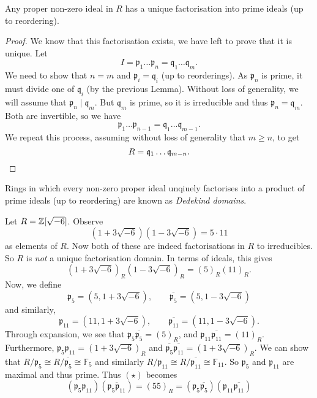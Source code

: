 
\begin{theorem}[]
	Any proper non-zero ideal in $R$ has a unique factorisation into prime
	ideals (up to reordering).
\end{theorem}

\begin{proof}
	We know that this factorisation exists,
	we have left to prove that it is unique.
	Let
	\[
		I 
		= \mathfrak p_1 \ldots \mathfrak p_n
		= \mathfrak q_1 \ldots \mathfrak q_m.
	\]
	We need to show that $n = m$ and $\mathfrak p_i = \mathfrak q_i$
	(up to reorderings).
	As $\mathfrak p_n$ is prime,
	it must divide one of $\mathfrak q_i$ (by the previous Lemma).
	Without loss of generality, we will assume that 
	$\mathfrak p_n \mid \mathfrak q_m$.
	But $\mathfrak q_m$ is prime, so it is irreducible and thus
	$\mathfrak p_n = \mathfrak q_m$.
	Both are invertible, so we have
	\[
		\mathfrak p_1 \ldots \mathfrak p_{n-1}
		= \mathfrak q_1 \ldots \mathfrak q_{m-1}.
	\]
	We repeat this process, assuming without loss of generality that
	$m \geq n$, to get
	\[
		R = \mathfrak q_1 \ldots \mathfrak q_{m-n}. \qedhere
	\]
\end{proof}

Rings in which every non-zero proper ideal unqiuely factorises into a product
of prime ideals (up to reordering) are known as \emph{Dedekind domains}.

\begin{example}[]
	Let $R = \mathbb{Z}[\sqrt{-6}]$.
	Observe
	\[
		(1 + 3\sqrt{-6})(1 - 3\sqrt{-6}) = 5 \cdot 11
	\]
	as elements of $R$.
	Now both of these are indeed factorisations in $R$ to irreducibles.
	So $R$ is \emph{not} a unique factorisation domain.
	In terms of ideals, this gives
	\[
		(1 + 3\sqrt{-6})_R (1 - 3\sqrt{-6})_R
		= (5)_R (11)_R. \tag{$\star$}
	\]
	Now, we define
	\[
		\mathfrak p_5 = (5, 1 + 3\sqrt{-6}), \qquad
		\overline{\mathfrak p_5} = (5, 1 - 3\sqrt{-6})
	\]
	and similarly,
	\[
		\mathfrak p_{11} = (11, 1 + 3\sqrt{-6}), \qquad
		\overline{\mathfrak p_{11}} = (11, 1 - 3\sqrt{-6}).
	\]
	Through expansion, we see that
	$\mathfrak p_5 \overline{\mathfrak p_5} = (5)_R$, and
	$\mathfrak p_{11} \overline{\mathfrak p_{11}} = (11)_R$.
	Furthermore,
	$\mathfrak p_5 \mathfrak p_{11} = (1 + 3\sqrt{-6})_R$ and
	$\overline{\mathfrak p_5} \overline{\mathfrak p_{11}}
	= (1 + 3\sqrt{-6})_R$.
	We can show that 
	$R/\mathfrak p_5 \cong R/\overline{\mathfrak p_5} \cong \mathbb F_5$
	and similarly 
	$R/\mathfrak p_{11} \cong R/\overline{\mathfrak p_{11}} \cong 
	\mathbb F_{11}$.
	So $\mathfrak p_5$ and $\mathfrak p_{11}$ are maximal and thus prime.
	Thus $(\star)$ becomes
	\[
		(\mathfrak p_5 \mathfrak p_{11})
		(\overline{\mathfrak p_5 \mathfrak p_{11}})
		= (55)_R
		= (\mathfrak p_5 \overline{\mathfrak p_5})
			(\mathfrak p_{11} \overline{\mathfrak p_{11}})
	\]
\end{example}

